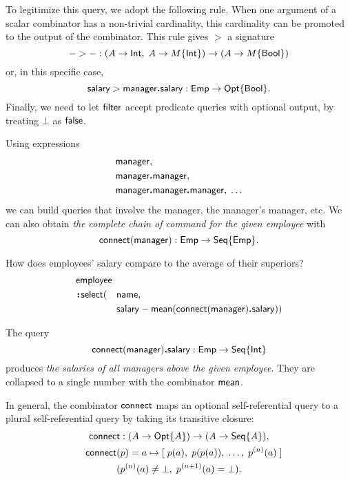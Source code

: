 To legitimize this query, we adopt the following rule.  When one argument of a
scalar combinator has a non-trivial cardinality, this cardinality can be
promoted to the output of the combinator.  This rule gives ${>}$ a signature
\begin{equation*}
    {-}>{-} : (A \to \mathsf{Int},\; A \to M\{\mathsf{Int}\}) \to (A \to M\{\mathsf{Bool}\})
\end{equation*}
or, in this specific case,
\begin{equation*}
    \mathsf{salary} > \mathsf{manager}\boldsymbol{.}\mathsf{salary} : \mathsf{Emp} \to \mathsf{Opt}{\left\{\mathsf{Bool}\right\}}.
\end{equation*}
Finally, we need to let $\mathsf{filter}$ accept predicate queries with optional
output, by treating $\bot$ as $\mathsf{false}$.

Using expressions
\begin{align*}
    & \mathsf{manager}, \\
    & \mathsf{manager}\boldsymbol{.}\mathsf{manager}, \\
    & \mathsf{manager}\boldsymbol{.}\mathsf{manager}\boldsymbol{.}\mathsf{manager},\; \ldots
\end{align*}
we can build queries that involve the manager, the manager's manager, etc.  We
can also obtain \emph{the complete chain of command for the given employee}
with
\begin{equation*}
    \mathsf{connect}(\mathsf{manager}) : \mathsf{Emp} \to \mathsf{Seq}{\left\{\mathsf{Emp}\right\}}.
\end{equation*}

\begin{demo}
    \label{ex:employee-salary-vs-superior}
    How does employees' salary compare to the average of their superiors?
    \begin{alignat*}{2}
        & \Employee\hidewidth && \\
        & \Apply\Select(&& \Name, \\
        & && \Salary-\Mean(\Connect(\Manager)\To\Salary))
    \end{alignat*}
\end{demo}

The query
\begin{equation*}
    \mathsf{connect}(\mathsf{manager})\boldsymbol{.}\mathsf{salary} : \mathsf{Emp} \to \mathsf{Seq}{\left\{\mathsf{Int}\right\}}
\end{equation*}
produces \emph{the salaries of all managers above the given employee}.  They
are collapsed to a single number with the combinator $\mathsf{mean}$.

In general, the combinator $\mathsf{connect}$ maps an optional self-referential query to a
plural self-referential query by taking its transitive closure:
\begin{multline*}
    \Connect : (A \to \Opt{A}) \to (A \to \Seq{A}), \\
    \shoveleft{\Connect(p) = a \mapsto [\;p(a),\; p(p(a)),\; \ldots,\; p^{(n)}(a)\;]} \\
    (p^{(n)}(a) \ne \bot,\; p^{(n+1)}(a) = \bot).
\end{multline*}



